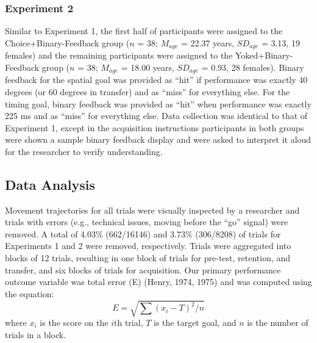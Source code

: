 \documentclass[
  man, donotrepeattitle,floatsintext]{apa7}
\begin{document}
\hypertarget{experiment-2-1}{%
\subsubsection{Experiment 2}\label{experiment-2-1}}

Similar to Experiment 1, the first half of participants were assigned to the Choice+Binary-Feedback group (\(n\) = 38; \(M_{age}\) = 22.37 years, \(SD_{age}\) = 3.13, 19 females) and the remaining participants were assigned to the Yoked+Binary-Feedback group (\(n\) = 38; \(M_{age}\) = 18.00 years, \(SD_{age}\) = 0.93, 28 females). Binary feedback for the spatial goal was provided as ``hit'' if performance was exactly 40 degrees (or 60 degrees in transfer) and as ``miss'' for everything else. For the timing goal, binary feedback was provided as ``hit'' when performance was exactly 225 ms and as ``miss'' for everything else. Data collection was identical to that of Experiment 1, except in the acquisition instructions participants in both groups were shown a sample binary feedback display and were asked to interpret it aloud for the researcher to verify understanding.

\hypertarget{data-analysis}{%
\subsection{Data Analysis}\label{data-analysis}}

Movement trajectories for all trials were visually inspected by a researcher and trials with errors (e.g., technical issues, moving before the ``go'' signal) were removed. A total of 4.03\% (662/16146) and 3.73\% (306/8208) of trials for Experiments 1 and 2 were removed, respectively. Trials were aggregated into blocks of 12 trials, resulting in one block of trials for pre-test, retention, and transfer, and six blocks of trials for acquisition. Our primary performance outcome variable was total error (E) (Henry, 1974, 1975) and was computed using the equation:
\begin{equation}
E = \sqrt{\sum{(x_{i} - T)^2 / n}}
\end{equation}
where \(x_{i}\) is the score on the \(i\)th trial, \(T\) is the target goal, and \(n\) is the number of trials in a block.
\end{document}

